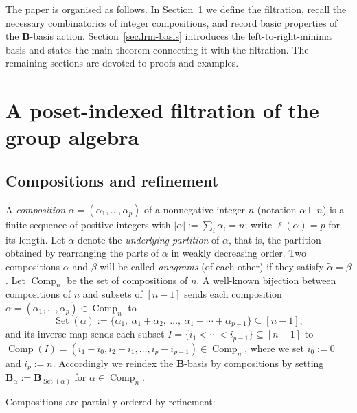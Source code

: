 \documentclass[submission]{FPSAC2026}
\newcommand{\Comp}{\operatorname{Comp}}
\begin{document}
The paper is organised as follows.  In Section~\ref{sec.filtration} we
define the filtration, recall the necessary combinatorics of integer
compositions, and record basic properties of the \(\mathbf{B}\)-basis
action. Section~\ref{sec.lrm-basis} introduces the left-to-right-minima basis
and states the main theorem connecting it with the filtration.
The remaining sections are devoted to proofs and examples.


\section{A poset-indexed filtration of the group algebra}
\label{sec.filtration}

\subsection{Compositions and refinement}
\label{sec:compositions}

A \emph{composition} \(\alpha=(\alpha_1,\dots,\alpha_p)\) of a nonnegative
integer \(n\) (notation \(\alpha\vDash n\)) is a finite sequence of positive
integers with \(|\alpha|:=\sum_i\alpha_i=n\); write \(\ell(\alpha)=p\) for
its length.
Let $\widetilde{\alpha}$ denote the \emph{underlying partition} of $\alpha$, that is, the partition obtained by rearranging the parts of $\alpha$ in weakly decreasing order.
Two compositions $\alpha$ and $\beta$ will be called \emph{anagrams}
(of each other) if they satisfy
$\widetilde{\alpha} =\widetilde{\beta}$.
Let \(\Comp_n\) be the set of compositions of \(n\).
A well-known bijection between compositions of \(n\) and subsets of
\([n-1]\) sends each composition \(\alpha=(\alpha_1,\dots,\alpha_p)
\in \Comp_n\) to
\[
\operatorname{Set}(\alpha)
 := \{\alpha_1,\ \alpha_1+\alpha_2,\ \dots,\ \alpha_1+\cdots+\alpha_{p-1}\}\subseteq[n-1],
\]
and its inverse map sends each subset \(I=\{i_1<\cdots<i_{p-1}\}\subseteq[n-1]\) to
\(\operatorname{Comp}(I)=(i_1-i_0,i_2-i_1,\dots,i_p-i_{p-1})\in\Comp_n\),
where we set \(i_0 := 0\) and \(i_p := n\).
Accordingly we reindex the \(\mathbf{B}\)-basis by compositions by
setting
\(\mathbf{B}_\alpha:=\mathbf{B}_{\operatorname{Set}(\alpha)}\) for
\(\alpha\in\Comp_n\).

Compositions are partially ordered by refinement:
\end{document}
